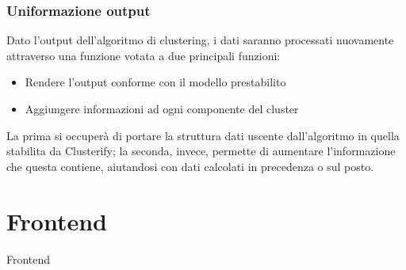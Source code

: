 		\subsubsection{Uniformazione output}
			Dato l'output dell'algoritmo di clustering, i dati saranno processati nuovamente attraverso una funzione votata a due principali funzioni:
			\begin{itemize}
  				\item Rendere l'output conforme con il modello prestabilito
	  			\item Aggiungere informazioni ad ogni componente del cluster
 			\end{itemize} 
			
			La prima si occuperà di portare la struttura dati uscente dall'algoritmo in quella stabilita da Clusterify; la seconda, invece, permette di aumentare l'informazione che questa contiene, aiutandosi con dati calcolati in precedenza o sul posto.

\section{Frontend}
	Frontend
